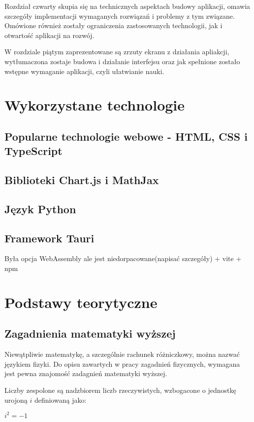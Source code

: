 \documentclass{SGGW-thesis}
\begin{document}
	Rozdział czwarty skupia się na technicznych aspektach budowy aplikacji, omawia szczegóły implementacji wymaganych rozwiązań i problemy z tym związane. Omówione również zostały ograniczenia zastosowanych technologii, jak i otwartość aplikacji na rozwój.
	
	W rozdziale piątym zaprezentowane są zrzuty ekranu z działania apliakcji, wytłumaczona zostaje budowa i działanie interfejsu oraz jak spełnione zostało wstępne wymaganie aplikacji, czyli ułatwianie nauki.
	
	
\chapter{Wykorzystane technologie}
	\section{Popularne technologie webowe - HTML, CSS i TypeScript}
	\section{Biblioteki Chart.js i MathJax}
	\section{Język Python}
	\section{Framework Tauri}
	Była opcja WebAssembly ale jest niedorpacowane(napisać szczegóły)
	+ vite + npm
	
\chapter{Podstawy teorytyczne}
	\section{Zagadnienia matematyki wyższej}
	Niewątpliwie matematykę, a szczególnie rachunek różniczkowy, można nazwać językiem fizyki. Do opisu zawartych w pracy zagadnień fizycznych, wymagana jest pewna znajomość zadagnień matematyki wyższej.

	Liczby zespolone są nadzbiorem liczb rzeczywistych, wzbogacone o jednostkę urojoną $i$ definiowaną jako: 
	
	\begin{center}
	$i^2=-1$\\
	\end{center}
	
\end{document}
